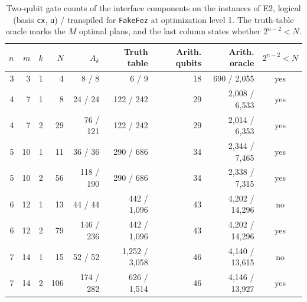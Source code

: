 \begin{table}[t]
\centering
\caption{Two-qubit gate counts of the interface components on the instances of E2, logical (basis \texttt{cx}, \texttt{u}) / transpiled for \texttt{FakeFez} at optimization level 1. The truth-table oracle marks the $M$ optimal plans, and the last column states whether $2^{n-2}<N$.}\label{tab:resources}
\small
\begin{tabular}{rrrrrrrrc}
\toprule
$n$ & $m$ & $k$ & $N$ & $A_k$ & Truth table & Arith. qubits & Arith. oracle & $2^{n-2}<N$ \\
\midrule
3 & 3 & 1 & 4 & 8 / 8 & 6 / 9 & 18 & 690 / 2{,}055 & yes \\
4 & 7 & 1 & 8 & 24 / 24 & 122 / 242 & 29 & 2{,}008 / 6{,}533 & yes \\
4 & 7 & 2 & 29 & 76 / 121 & 122 / 242 & 29 & 2{,}014 / 6{,}353 & yes \\
5 & 10 & 1 & 11 & 36 / 36 & 290 / 686 & 34 & 2{,}344 / 7{,}465 & yes \\
5 & 10 & 2 & 56 & 118 / 190 & 290 / 686 & 34 & 2{,}338 / 7{,}315 & yes \\
6 & 12 & 1 & 13 & 44 / 44 & 442 / 1{,}096 & 43 & 4{,}202 / 14{,}296 & no \\
6 & 12 & 2 & 79 & 146 / 236 & 442 / 1{,}096 & 43 & 4{,}202 / 14{,}296 & yes \\
7 & 14 & 1 & 15 & 52 / 52 & 1{,}252 / 3{,}058 & 46 & 4{,}140 / 13{,}615 & no \\
7 & 14 & 2 & 106 & 174 / 282 & 626 / 1{,}514 & 46 & 4{,}146 / 13{,}927 & yes \\
\bottomrule
\end{tabular}
\end{table}
